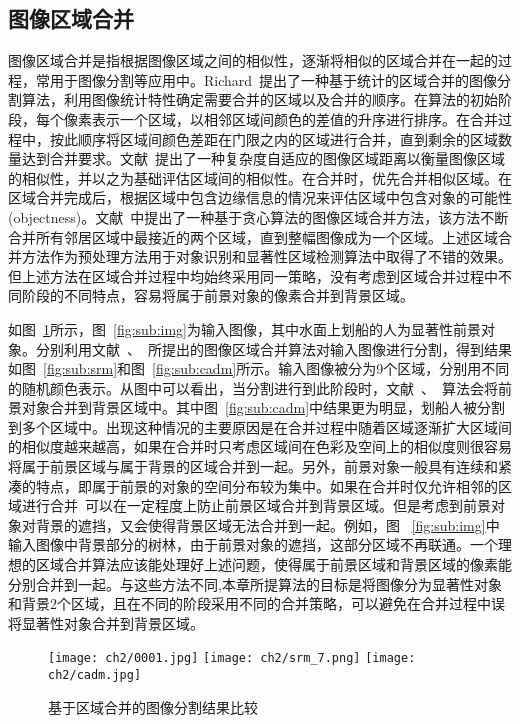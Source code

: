 \subsection{图像区域合并}
\label{sec:regionMerging}
图像区域合并是指根据图像区域之间的相似性，逐渐将相似的区域合并在一起的过程，常用于图像分割等应用中。Richard~\cite{Richard2004Statistical}提出了一种基于统计的区域合并的图像分割算法，利用图像统计特性确定需要合并的区域以及合并的顺序。在算法的初始阶段，每个像素表示一个区域，以相邻区域间颜色的差值的升序进行排序。在合并过程中，按此顺序将区域间颜色差距在门限之内的区域进行合并，直到剩余的区域数量达到合并要求。文献~提出了一种复杂度自适应的图像区域距离以衡量图像区域的相似性，并以之为基础评估区域间的相似性。在合并时，优先合并相似区域。在区域合并完成后，根据区域中包含边缘信息的情况来评估区域中包含对象的可能性(objectness)。文献~中提出了一种基于贪心算法的图像区域合并方法，该方法不断合并所有邻居区域中最接近的两个区域，直到整幅图像成为一个区域。上述区域合并方法作为预处理方法用于对象识别和显著性区域检测算法中取得了不错的效果。但上述方法在区域合并过程中均始终采用同一策略，没有考虑到区域合并过程中不同阶段的不同特点，容易将属于前景对象的像素合并到背景区域。\par
如图~\ref{fig:rm}所示，图~\ref{fig:sub:img}为输入图像，其中水面上划船的人为显著性前景对象。分别利用文献~、~所提出的图像区域合并算法对输入图像进行分割，得到结果如图~\ref{fig:sub:srm}和图~\ref{fig:sub:cadm}所示。输入图像被分为9个区域，分别用不同的随机颜色表示。从图中可以看出，当分割进行到此阶段时，文献~、~算法会将前景对象合并到背景区域中。其中图~\ref{fig:sub:cadm}中结果更为明显，划船人被分割到多个区域中。出现这种情况的主要原因是在合并过程中随着区域逐渐扩大区域间的相似度越来越高，如果在合并时只考虑区域间在色彩及空间上的相似度则很容易将属于前景区域与属于背景的区域合并到一起。另外，前景对象一般具有连续和紧凑的特点，即属于前景的对象的空间分布较为集中。如果在合并时仅允许相邻的区域进行合并~\cite{SelectiveSearch}可以在一定程度上防止前景区域合并到背景区域。但是考虑到前景对象对背景的遮挡，又会使得背景区域无法合并到一起。例如，图 ~\ref{fig:sub:img}中输入图像中背景部分的树林，由于前景对象的遮挡，这部分区域不再联通。一个理想的区域合并算法应该能处理好上述问题，使得属于前景区域和背景区域的像素能分别合并到一起。与这些方法不同,本章所提算法的目标是将图像分为显著性对象和背景2个区域，且在不同的阶段采用不同的合并策略，可以避免在合并过程中误将显著性对象合并到背景区域。
\begin{figure}[htb]
  \centering%
    {\texttt{[image: ch2/0001.jpg]}}%
 \hspace{1em}%
      {\texttt{[image: ch2/srm\_7.png]}}
 \hspace{1em}
      {\texttt{[image: ch2/cadm.jpg]}}
  \caption{基于区域合并的图像分割结果比较}
  \label{fig:rm}
\end{figure}


